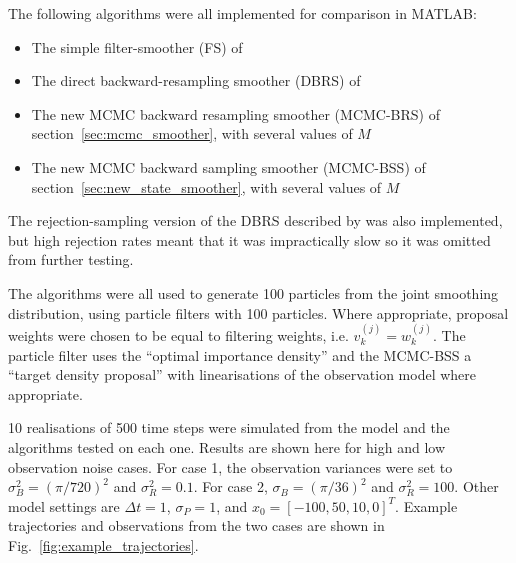 \documentclass[10pt,twocolumn,twoside]{IEEEtran}
\begin{document}
The following algorithms were all implemented for comparison in MATLAB:

\begin{itemize}
	\item The simple filter-smoother (FS) of \cite{Kitagawa1996}
	\item The direct backward-resampling smoother (DBRS) of \cite{Godsill2004}
	\item The new MCMC backward resampling smoother (MCMC-BRS) of section~\ref{sec:mcmc_smoother}, with several values of $M$
	\item The new MCMC backward sampling smoother (MCMC-BSS) of section~\ref{sec:new_state_smoother}, with several values of $M$
\end{itemize}

The rejection-sampling version of the DBRS described by \cite{Douc2009} was also implemented, but high rejection rates meant that it was impractically slow so it was omitted from further testing.

The algorithms were all used to generate 100 particles from the joint smoothing distribution, using particle filters with 100 particles. Where appropriate, proposal weights were chosen to be equal to filtering weights, i.e. $v_k^{(j)} = w_k^{(j)}$. The particle filter uses the ``optimal importance density'' and the MCMC-BSS a ``target density proposal'' with linearisations of the observation model where appropriate.

10 realisations of 500 time steps were simulated from the model and the algorithms tested on each one. Results are shown here for high and low observation noise cases. For case 1, the observation variances were set to $\sigma_B^2 = (\pi/720)^2$ and $\sigma_R^2 = 0.1$. For case 2, $\sigma_B = (\pi/36)^2$ and $\sigma_R^2 = 100$. Other model settings are $\Delta t = 1$, $\sigma_P = 1$, and $x_0 = [-100, 50, 10, 0]^T$. Example trajectories and observations from the two cases are shown in Fig.~\ref{fig:example_trajectories}.
\end{document}
